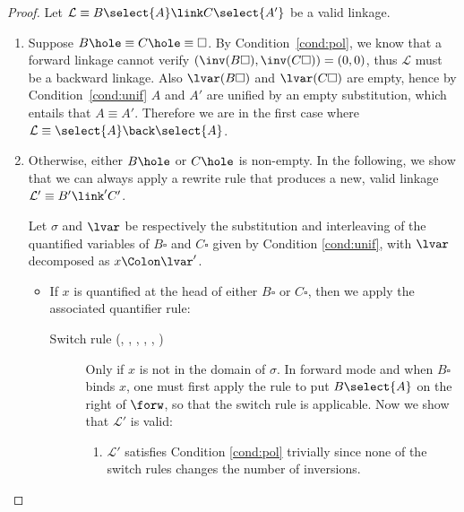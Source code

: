 \begin{proof}
  Let $\mathcal{L} \equiv B\select{A} \link C\select{A'}$ be a valid linkage.\\
  \begin{enumerate}
    \setlength{\itemsep}{1em}
    \item Suppose $B\hole \equiv C\hole \equiv \square$. By
    Condition~\ref{cond:pol}, we know that a forward linkage cannot verify
    $(\inv(B\square), \inv(C\square)) = (0,0)$, thus $\mathcal{L}$ must be a
    backward linkage. Also $\lvar(B\square)$ and $\lvar(C\square)$ are empty,
    hence by Condition~\ref{cond:unif} $A$ and $A'$ are unified by an empty
    substitution, which entails that $A \equiv A'$. Therefore we are in the
    first case where $\mathcal{L} \equiv \select{A} \back \select{A}$.

    \item Otherwise, either $B\hole$ or $C\hole$ is non-empty. In the following,
    we show that we can always apply a rewrite rule that produces a new, valid
    linkage $\mathcal{L'} \equiv B' \link' C'$.
    
    Let $\sigma$ and $\lvar$ be respectively the substitution and interleaving
    of the quantified variables of $B\square$ and $C\square$ given by Condition
    \ref{cond:unif}, with $\lvar$ decomposed as $x \Colon \lvar'$.
    
    \begin{itemize}
      \item If $x$ is quantified at the head of either $B\square$ or $C\square$,
        then we apply the associated quantifier rule:

        \begin{description}
          \item[Switch rule (, ,
          , , ,
          )] Only if $x$ is not in the domain of $\sigma$. In
          forward mode and when $B\square$ binds $x$, one must first apply the
          rule  to put $B\select{A}$ on the right of $\forw$, so
          that the switch rule is applicable. Now we show that $\mathcal{L'}$ is
          valid:

          \begin{enumerate}
            \setlength{\itemsep}{0.8em}
            \renewcommand{\labelenumii}{\theenumii}
            \renewcommand{\theenumii}{\arabic{enumii}.}

            \item $\mathcal{L'}$ satisfies Condition \ref{cond:pol} trivially
            since none of the switch rules changes the number of inversions.


\end{enumerate}
\end{description}
\end{itemize}
\end{enumerate}
\end{proof}
